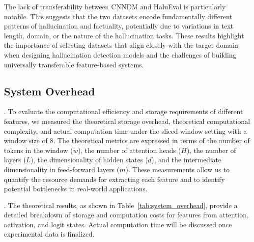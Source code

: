 The lack of transferability between CNNDM and HaluEval is particularly notable. This suggests that the two datasets encode fundamentally different patterns of hallucination and factuality, potentially due to variations in text length, domain, or the nature of the hallucination tasks. These results highlight the importance of selecting datasets that align closely with the target domain when designing hallucination detection models and the challenges of building universally transferable feature-based systems.

\subsection{System Overhead}\label{sec:detect:cost}

.
To evaluate the computational efficiency and storage requirements of different features, we measured the theoretical storage overhead, theoretical computational complexity, and actual computation time under the sliced window setting with a window size of 8. The theoretical metrics are expressed in terms of the number of tokens in the window ($w$), the number of attention heads ($H$), the number of layers ($L$), the dimensionality of hidden states ($d$), and the intermediate dimensionality in feed-forward layers ($m$). These measurements allow us to quantify the resource demands for extracting each feature and to identify potential bottlenecks in real-world applications.

.
The theoretical results, as shown in Table~\ref{tab:system_overhead}, provide a detailed breakdown of storage and computation costs for features from attention, activation, and logit states. Actual computation time will be discussed once experimental data is finalized.

